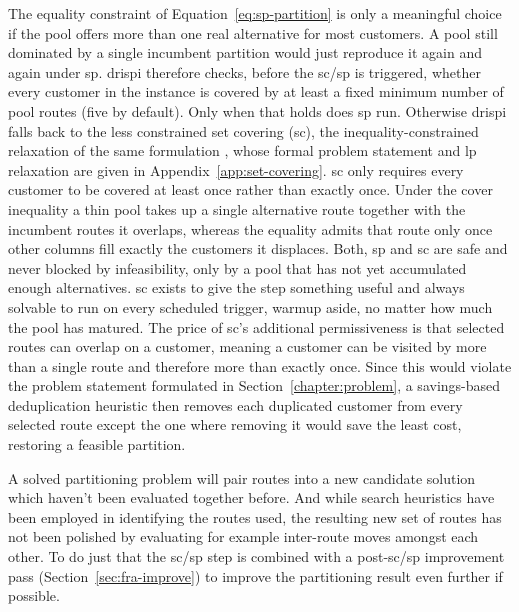The equality constraint of Equation~\ref{eq:sp-partition} is only a meaningful choice if the pool offers more than one real alternative for most customers. A pool still dominated by a single incumbent partition would just reproduce it again and again under \gls{sp}. \gls{drispi} therefore checks, before the \gls{sc}/\gls{sp} is triggered, whether every customer in the instance is covered by at least a fixed minimum number of pool routes (five by default). Only when that holds does \gls{sp} run. Otherwise \gls{drispi} falls back to the less constrained set covering (\gls{sc}), the inequality-constrained relaxation of the same formulation \citep{garfinkelSetPartitioningProblemSetCovering1969}, whose formal problem statement and \gls{lp} relaxation are given in Appendix~\ref{app:set-covering}. \gls{sc} only requires every customer to be covered at least once rather than exactly once. Under the cover inequality a thin pool takes up a single alternative route together with the incumbent routes it overlaps, whereas the equality admits that route only once other columns fill exactly the customers it displaces. Both, \gls{sp} and \gls{sc} are safe and never blocked by infeasibility, only by a pool that has not yet accumulated enough alternatives. \gls{sc} exists to give the step something useful and always solvable to run on every scheduled trigger, warmup aside, no matter how much the pool has matured. The price of \gls{sc}'s additional permissiveness is that selected routes can overlap on a customer, meaning a customer can be visited by more than a single route and therefore more than exactly once. Since this would violate the problem statement formulated in Section~\ref{chapter:problem}, a savings-based deduplication heuristic then removes each duplicated customer from every selected route except the one where removing it would save the least cost, restoring a feasible partition.

A solved partitioning problem will pair routes into a new candidate solution which haven't been evaluated together before. And while search heuristics have been employed in identifying the routes used, the resulting new set of routes has not been polished by evaluating for example inter-route moves amongst each other. To do just that the \gls{sc}/\gls{sp} step is combined with a post-\gls{sc}/\gls{sp} improvement pass (Section~\ref{sec:fra-improve}) to improve the partitioning result even further if possible.

